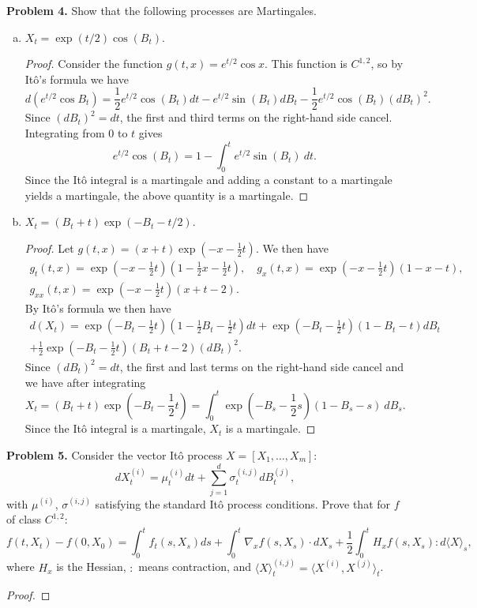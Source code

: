 \documentclass[11pt,letterpaper]{report}
\begin{document}
\noindent\textbf{Problem 4. }
Show that the following processes are Martingales.
\begin{enumerate}[a)]
	\item $X_t = \exp(t/2)\cos(B_t)$.
	\begin{proof}
		Consider the function $g(t, x) = e^{t/2}\cos x$. This function is $C^{1, 2}$, so by It\^o's formula we have
		\[
		d(e^{t/2}\cos B_t) = \frac{1}{2}e^{t/2}\cos(B_t)dt - e^{t/2}\sin(B_t)dB_t - \frac{1}{2}e^{t/2}\cos(B_t)(dB_t)^2.
		\]
		Since $(dB_t)^2 = dt$, the first and third terms on the right-hand side cancel. Integrating from $0$ to $t$ gives
		\[
		e^{t/2}\cos(B_t) = 1 - \int_0^te^{t/2}\sin(B_t)\ dt.
		\]
		Since the It\^o integral is a martingale and adding a constant to a martingale yields a martingale, the above quantity is a martingale.
	\end{proof}
	\item $X_t = (B_t+t)\exp(-B_t-t/2)$.
	\begin{proof}
		Let $g(t, x) = (x+t)\exp(-x-\frac{1}{2}t)$. We then have
		\begin{gather*}
		g_t(t, x) = \exp\left(-x-\frac{1}{2}t\right)\left(1-\frac{1}{2}x-\frac{1}{2}t\right),\quad g_x(t, x) = \exp\left(-x-\frac{1}{2}t\right)(1-x-t),\\
		g_{xx}(t, x) = \exp\left(-x-\frac{1}{2}t\right)(x+t-2).
		\end{gather*}
		By It\^o's formula we then have
		\begin{multline*}
		d(X_t) = \exp\left(-B_t-\frac{1}{2}t\right)\left(1-\frac{1}{2}B_t-\frac{1}{2}t\right)dt+ \exp\left(-B_t-\frac{1}{2}t\right)(1-B_t-t)dB_t\\
		 + \frac{1}{2}\exp\left(-B_t-\frac{1}{2}t\right)(B_t+t-2)(dB_t)^2.
		\end{multline*}
		Since $(dB_t)^2 = dt$, the first and last terms on the right-hand side cancel and we have after integrating
		\[
		X_t = (B_t+t)\exp\left(-B_t-\frac{1}{2}t\right) = \int_0^t\exp\left(-B_s-\frac{1}{2}s\right)(1-B_s-s)\ dB_s.
		\]
		Since the It\^o integral is a martingale, $X_t$ is a martingale.
	\end{proof}
\end{enumerate}

\noindent\textbf{Problem 5. }
Consider the vector It\^o process $X=[X_1, \ldots, X_m]$:
\[
dX_t^{(i)} = \mu_t^{(i)}dt + \sum_{j=1}^d\sigma^{(i,j)}_tdB_t^{(j)},
\]
with $\mu^{(i)}$, $\sigma^{(i,j)}$ satisfying the standard It\^o process conditions. Prove that for $f$ of class $C^{1,2}$:
\[
f(t, X_t)-f(0, X_0) = \int_0^tf_t(s, X_s)ds + \int_0^t\nabla_xf(s, X_s)\cdot dX_s + \frac{1}{2}\int_0^tH_xf(s, X_s):d\langle X\rangle_s,
\]
where $H_x$ is the Hessian, $:$ means contraction, and $\langle X\rangle^{(i,j)}_t = \langle X^{(i)}, X^{(j)}\rangle_t$.
\begin{proof}
	
\end{proof}
\end{document}
